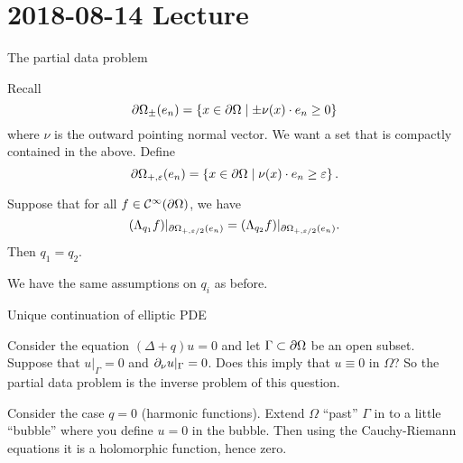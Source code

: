\section{2018-08-14 Lecture}

The partial data problem

Recall
\[ \partial\Omega_\pm(e_n) = \left\{ x \in \partial\Omega \mid \pm \nu(x) \cdot e_n \geq 0 \right\} \]
where $\nu$ is the outward pointing normal vector.
We want a set that is compactly contained in the above.
Define
\[ \partial\Omega_{+,\varepsilon}(e_n) = \left\{ x \in \partial\Omega \mid \nu(x) \cdot e_n \geq \varepsilon \right\}. \]

\begin{thm}\label{5:partial}
  Suppose that for all $f \in \mathcal{C}^\infty(\partial\Omega)$, we have
  \[ (\Lambda_{q_1}f)|_{\partial\Omega_{+,\varepsilon/2}(e_n)} = (\Lambda_{q_2}f)|_{\partial\Omega_{+,\varepsilon/2}(e_n)}. \]
  Then $q_1=q_2$.
\end{thm}
We have the same assumptions on $q_i$ as before.

Unique continuation of elliptic PDE

Consider the equation $(\Delta+q)u=0$ and let $\Gamma \subset \partial\Omega$ be an open subset.
Suppose that $u|_{\Gamma}=0$ and $\partial_\nu u|_\Gamma=0$.
Does this imply that $u \equiv 0$ in $\Omega$?
So the partial data problem is the inverse problem of this question.

Consider the case $q=0$ (harmonic functions).
Extend $\Omega$ ``past'' $\Gamma$ in to a little ``bubble'' where you define $u=0$ in the bubble.
Then using the Cauchy-Riemann equations it is a holomorphic function, hence zero.

